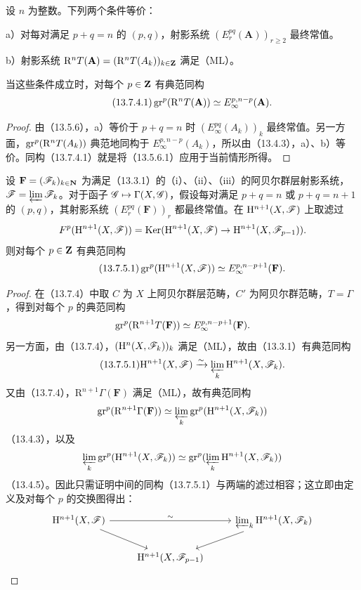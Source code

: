 设 $n$ 为整数。下列两个条件等价：

\noindent a）对每对满足 $p+q=n$ 的 $(p,q)$，射影系统 $(E_r^{pq}(\mathbf A))_{r\geq2}$ 最终常值。

\noindent b）射影系统 $\mathrm R^nT(\mathbf A)=(\mathrm R^nT(A_k))_{k\in\mathbf Z}$ 满足（ML）。

当这些条件成立时，对每个 $p\in\mathbf Z$ 有典范同构
\begin{equation}\tag{13.7.4.1}
\operatorname{gr}^p(\mathrm R^nT(\mathbf A))\simeq E_\infty^{p,n-p}(\mathbf A).
\end{equation}
\begin{proof}
由（13.5.6），a）等价于 $p+q=n$ 时 $(E_\infty^{pq}(A_k))_k$ 最终常值。另一方面，$\operatorname{gr}^p(\mathrm R^nT(A_k))$ 典范地同构于 $E_\infty^{p,n-p}(A_k)$，所以由（13.4.3），a）、b）等价。同构（13.7.4.1）就是将（13.5.6.1）应用于当前情形所得。
\end{proof}

设 $\mathbf F=(\mathscr F_k)_{k\in\mathbf N}$ 为满足（13.3.1）的（i）、（ii）、（iii）的阿贝尔群层射影系统，$\mathscr F=\varprojlim\mathscr F_k$。对于函子 $\mathscr G\mapsto\Gamma(X,\mathscr G)$，假设每对满足 $p+q=n$ 或 $p+q=n+1$ 的 $(p,q)$，其射影系统 $(E_r^{pq}(\mathbf F))_r$ 都最终常值。在 $\mathrm H^{n+1}(X,\mathscr F)$ 上取滤过
\[
F^p(\mathrm H^{n+1}(X,\mathscr F))
=\operatorname{Ker}(\mathrm H^{n+1}(X,\mathscr F)\to\mathrm H^{n+1}(X,\mathscr F_{p-1})).
\]
则对每个 $p\in\mathbf Z$ 有典范同构
\begin{equation}\tag{13.7.5.1}
\operatorname{gr}^p(\mathrm H^{n+1}(X,\mathscr F))\simeq E_\infty^{p,n-p+1}(\mathbf F).
\end{equation}
\begin{proof}
在（13.7.4）中取 $C$ 为 $X$ 上阿贝尔群层范畴，$C'$ 为阿贝尔群范畴，$T=\Gamma$，得到对每个 $p$ 的典范同构
\[
\operatorname{gr}^p(\mathrm R^{n+1}T(\mathbf F))\simeq E_\infty^{p,n-p+1}(\mathbf F).
\]
另一方面，由（13.7.4），$(\mathrm H^n(X,\mathscr F_k))_k$ 满足（ML），故由（13.3.1）有典范同构
\begin{equation}\tag{13.7.5.1}
\mathrm H^{n+1}(X,\mathscr F)\xrightarrow{\sim}\varprojlim_k\mathrm H^{n+1}(X,\mathscr F_k).
\end{equation}
又由（13.7.4），$\mathrm R^{n+1}\Gamma(\mathbf F)$ 满足（ML），故有典范同构
\[
\operatorname{gr}^p(\mathrm R^{n+1}\Gamma(\mathbf F))
\simeq\varprojlim_k\operatorname{gr}^p(\mathrm H^{n+1}(X,\mathscr F_k))
\]
（13.4.3），以及
\[
\varprojlim_k\operatorname{gr}^p(\mathrm H^{n+1}(X,\mathscr F_k))
\simeq\operatorname{gr}^p(\varprojlim_k\mathrm H^{n+1}(X,\mathscr F_k))
\]
（13.4.5）。因此只需证明中间的同构（13.7.5.1）与两端的滤过相容；这立即由定义及对每个 $p$ 的交换图得出：
\[
\begin{tikzcd}
\mathrm H^{n+1}(X,\F)\arrow[rr,"\sim"]\arrow[dr]&&\plim_k\mathrm H^{n+1}(X,\F_k)\arrow[dl]\\
&\mathrm H^{n+1}(X,\F_{p-1})&
\end{tikzcd}
\]
\end{proof}

